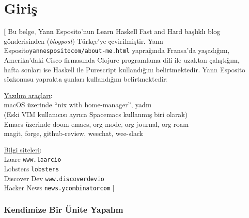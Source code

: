 \documentclass[a4paper,14pt,openany]{extbook} %
\let\emph\textit
\newcommand{\yazar}{Yann Esposito}%
\begin{document}
\part{Giriş}[\noindent\Palatino
\noindent Bu belge, \yazar'nun Learn Haskell Fast and Hard %
başlıklı blog gönderisinden (\emph{blogpost}) Türkçe'ye çevirilmiştir.
\yazar \texttt{yannesposito\centerdot com/about-me.html} yaprağında Fransa'da yaşadığını, Amerika'daki Cisco
firmasında Clojure programlama dili ile uzaktan çalıştığını, hafta sonları ise Haskell ile Purescript kullandığını
belirtmektedir. \yazar\, sözkonusu yaprakta şunları kullandığını belirtmektedir:\\
\vspace{2pt}

\renewcommand{\ULdepth}{1.8pt} %
\uline{Yazılım araçları}:\\
macOS üzerinde ``nix with home-manager'', yadm\\
(Eski VIM kullanıcısı ayrıca Spacemacs kullanmış biri olarak)\\
Emacs üzerinde doom-emacs, org-mode, org-journal, org-roam\\
magit, forge, github-review, weechat, wee-slack\\

\vspace{5pt}

\uline{Bilgi siteleri}:\\
Laarc \texttt{www.laarc\centerdot io}\\
Lobsters \texttt{lobste\centerdot rs}\\
Discover Dev \texttt{www.discoverdev\centerdot io}\\
Hacker News \texttt{news.ycombinator\centerdot com}
]




\section{Kendimize Bir Ünite Yapalım}%
\end{document}
